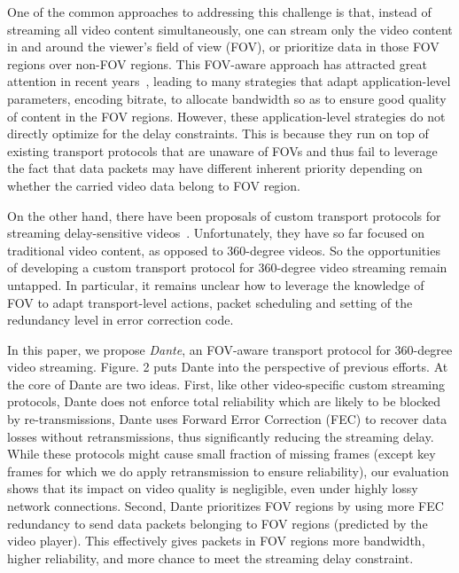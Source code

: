 One of the common approaches to addressing this challenge is that, 
instead of streaming all video content simultaneously, one can stream
only the video content in and around the viewer's field of view (FOV),
or prioritize data in those FOV regions over non-FOV regions. This 
FOV-aware approach has attracted great attention in recent 
years~\cite{Viewport-adaptive,360ProbDASH,Adaptive_Streaming_Framework,Two-tier,Omnidirectional_Video_over_HTTP,Furion}, 
leading to many strategies that adapt application-level parameters, \eg 
encoding bitrate, to allocate bandwidth so as to ensure good quality of
content in the FOV regions. However, these application-level strategies 
do not directly optimize for the delay constraints. This is because 
they run on top of existing transport protocols that are unaware of FOVs
and thus fail to leverage the fact that data packets may have different
inherent priority depending on whether the carried video data belong to
FOV region.

On the other hand, there have been proposals of custom transport 
protocols for streaming delay-sensitive videos~\cite{MPMTP,CMT-VR,ADMIT}. 
Unfortunately, they have so far focused on traditional video content, 
as opposed to 360-degree videos. So the opportunities of developing a 
custom transport protocol for 360-degree video streaming remain untapped.
In particular, it remains unclear how to leverage the knowledge of FOV
to adapt transport-level actions, \eg packet scheduling and setting of 
the redundancy level in error correction code.

In this paper, we propose {\em Dante}, an FOV-aware transport protocol
for 360-degree video streaming. Figure. 2 puts Dante into the perspective
of previous efforts. At the core of Dante are two ideas. First, like 
other video-specific custom streaming protocols, Dante does not enforce
total reliability which are likely to be blocked by re-transmissions, 
Dante uses Forward Error Correction (FEC) to recover data losses 
without retransmissions, thus significantly reducing the streaming delay.
While these protocols might cause small fraction of missing frames 
(except key frames for which we do apply retransmission to ensure 
reliability), our evaluation shows that its impact on video quality is 
negligible, even under highly lossy network connections. 
Second, Dante prioritizes FOV regions by using more FEC redundancy to 
send data packets belonging to FOV regions (predicted by the 
video player). This effectively gives packets in FOV regions more 
bandwidth, higher reliability, and more chance to meet the streaming 
delay constraint.


